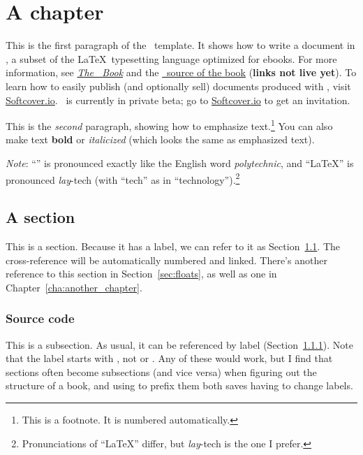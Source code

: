 \chapter{A chapter}
\label{cha:a_chapter}

This is the first paragraph of the \PolyTeXnic\ template. It shows how to write a document in \PolyTeX, a subset of the \LaTeX\ typesetting language optimized for ebooks. For more information, see \href{http://polytexnic.org/book}{\emph{The \PolyTeXnic\ Book}} and the \href{http://polytexnic.org/source}{\PolyTeX\ source of the book} (\textbf{links not live yet}). To learn how to easily publish (and optionally sell) documents produced with \PolyTeXnic, visit \href{http://softcover.io/}{Softcover.io}. \PolyTeXnic\ is currently in private beta; go to \href{http://softcover.io/}{Softcover.io} to get an invitation.

This is the \emph{second} paragraph, showing how to emphasize text.\footnote{This is a footnote. It is numbered automatically.} You can also make text \textbf{bold} or \textit{italicized} (which looks the same as emphasized text).

\emph{Note}: ``\PolyTeXnic'' is pronounced exactly like the English word \emph{polytechnic}, and ``\LaTeX'' is pronounced \emph{lay}-tech (with ``tech'' as in ``technology'').\footnote{Pronunciations of ``\LaTeX'' differ, but \emph{lay}-tech is the one I prefer.}

\section{A section}
\label{sec:a_section}

This is a section. Because it has a label, we can refer to it as Section~\ref{sec:a_section}. The cross-reference will be automatically numbered and linked. There's another reference to this section in Section~\ref{sec:floats}, as well as one in Chapter~\ref{cha:another_chapter}.

\subsection{Source code}
\label{sec:source_code}

This is a subsection. As usual, it can be referenced by label (Section~\ref{sec:source_code}). Note that the label starts with , not  or . Any of these would work, but I find that sections often become subsections (and vice versa) when figuring out the structure of a book, and using  to prefix them both saves having to change labels.

